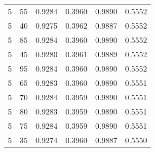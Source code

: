 \begin{center}
\begin{longtable}{|l|l|l|l|l|l|}
5  & 55 & 0.9284 & 0.3960 & 0.9890 & 0.5552 \\
5  & 40 & 0.9275 & 0.3962 & 0.9887 & 0.5552 \\
5  & 85 & 0.9284 & 0.3960 & 0.9890 & 0.5552 \\
5  & 45 & 0.9280 & 0.3961 & 0.9889 & 0.5552 \\
5  & 95 & 0.9284 & 0.3960 & 0.9890 & 0.5552 \\
5  & 65 & 0.9283 & 0.3960 & 0.9890 & 0.5551 \\
5  & 70 & 0.9284 & 0.3959 & 0.9890 & 0.5551 \\
5  & 80 & 0.9283 & 0.3959 & 0.9890 & 0.5551 \\
5  & 75 & 0.9284 & 0.3959 & 0.9890 & 0.5551 \\
5  & 35 & 0.9274 & 0.3960 & 0.9887 & 0.5550
\end{longtable}

\end{center}